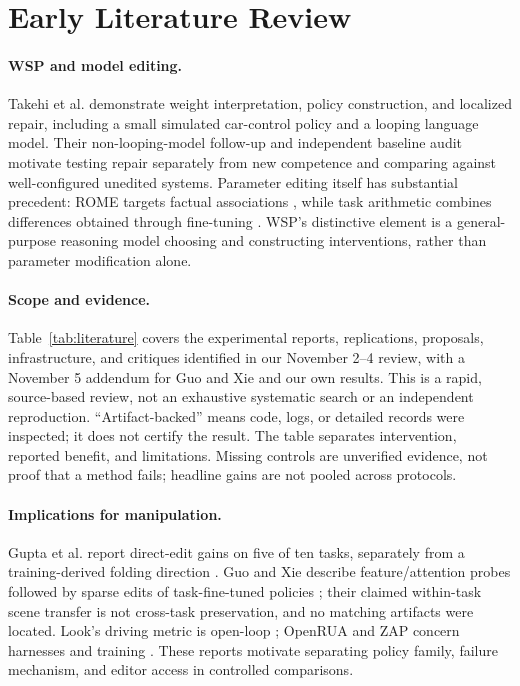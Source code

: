 \section{Early Literature Review}
\paragraph{WSP and model editing.}
Takehi et al. \citep{takehi2026sparks} demonstrate weight interpretation, policy construction, and localized repair, including a small simulated car-control policy and a looping language model. Their non-looping-model follow-up and independent baseline audit \citep{toledo2026audit} motivate testing repair separately from new competence and comparing against well-configured unedited systems. Parameter editing itself has substantial precedent: ROME targets factual associations \citep{meng2022rome}, while task arithmetic combines differences obtained through fine-tuning \citep{ilharco2023arithmetic}. WSP's distinctive element is a general-purpose reasoning model choosing and constructing interventions, rather than parameter modification alone.

\paragraph{Scope and evidence.}
Table~\ref{tab:literature} covers the experimental reports, replications, proposals, infrastructure, and critiques identified in our November 2--4 review, with a November 5 addendum for Guo and Xie and our own results. This is a rapid, source-based review, not an exhaustive systematic search or an independent reproduction. ``Artifact-backed'' means code, logs, or detailed records were inspected; it does not certify the result. The table separates intervention, reported benefit, and limitations. Missing controls are unverified evidence, not proof that a method fails; headline gains are not pooled across protocols.

\paragraph{Implications for manipulation.}
Gupta et al. report direct-edit gains on five of ten tasks, separately from a training-derived folding direction \citep{gupta2026robotweights}. Guo and Xie describe feature/attention probes followed by sparse edits of task-fine-tuned policies \citep{guo2026robotweights,xie2026robotweights}; their claimed within-task scene transfer is not cross-task preservation, and no matching artifacts were located. Look's driving metric is open-loop \citep{look2026uniad}; OpenRUA and ZAP concern harnesses and training \citep{zuo2026openrua,ben2026zap}. These reports motivate separating policy family, failure mechanism, and editor access in controlled comparisons.
